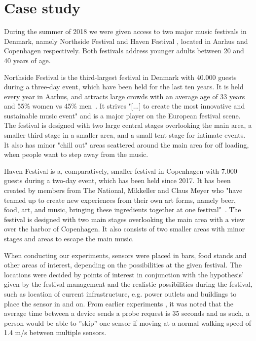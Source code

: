 \section{Case study} \label{cases}
During the summer of 2018 we were given access to two major music festivals in Denmark, namely Northside Festival \cite{northside} and Haven Festival \cite{haven}, located in Aarhus and Copenhagen respectively. Both festivals address younger adults between 20 and 40 years of age.

Northside Festival is the third-largest festival in Denmark with 40.000 guests during a three-day event, which have been held for the last ten years. It is held every year in Aarhus, and attracts large crowds with an average age of 33 years and 55\% women vs 45\% men~\cite{avgagens}. It strives "[...] to create the most innovative and sustainable music event" \cite{nscore} and is a major player on the European festival scene. The festival is designed with two large central stages overlooking the main area, a smaller third stage in a smaller area, and a small tent stage for intimate events. It also has minor "chill out" areas scattered around the main area for off loading, when people want to step away from the music. 

Haven Festival is a, comparatively, smaller festival in Copenhagen with 7.000 guests during a two-day event, which has been held since 2017. It has been created by members from The National, Mikkeller and Claus Meyer who "have teamed up to create new experiences from their own art forms, namely beer, food, art, and music, bringing these ingredients together at one festival"~\cite{havenabout}. The festival is designed with two main stages overlooking the main area with a view over the harbor of Copenhagen. It also consists of two smaller areas with minor stages and areas to escape the main music.

When conducting our experiments, sensors were placed in bars, food stands and other areas of interest, depending on the possibilities at the given festival. The locations were decided by points of interest in conjunction with the hypothesis’ given by the festival management and the realistic possibilities during the festival, such as location of current infrastructure, e.g. power outlets and buildings to place the sensor in and on. From earlier experiments \cite{aiexperiments}, it was noted that the average time between a device sends a probe request is 35 seconds and as such, a person would be able to ”skip” one sensor if moving at a normal walking speed \cite{walkingspeed} of 1.4 m/s between multiple sensors. 


